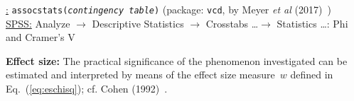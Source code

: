 \medskip
\noindent
\underline{\R:} \texttt{assocstats(\textit{contingency table})}
(package: \texttt{vcd}, by Meyer \textit{et al}
(2017)~) \\
\underline{SPSS:} Analyze $\rightarrow$ Descriptive Statistics
$\rightarrow$ Crosstabs \ldots $\rightarrow$ Statistics \ldots:
Phi and Cramer's V

\medskip
\noindent
\textbf{Effect size:} The practical significance of the phenomenon investigated can be estimated and interpreted by means of the
effect size measure~$w$ defined in Eq.~(\ref{eq:eschisq});
cf. Cohen (1992)~.

